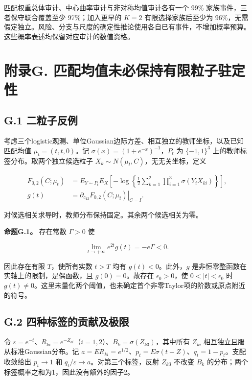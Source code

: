 \documentclass[11pt,a4paper]{article}
\begin{document}
匹配权重总体审计、中心曲率审计与非对称均值审计各有一个 99\%
家族事件，三者保守联合覆盖至少 97\%；加入更早的 \(K=2\)
有限选择家族后至少为
96\%，无需假定独立。风险、分支与尺度的确定性推论使用各自已有事件，不增加概率预算。这些概率表述均保留对应审计的数值资格。

\clearpage

\section*{附录G.
匹配均值未必保持有限粒子驻定性}\label{ux9644ux5f55g.-ux5339ux914dux5747ux503cux672aux5fc5ux4fddux6301ux6709ux9650ux7c92ux5b50ux9a7bux5b9aux6027}

\subsection*{G.1 二粒子反例}\label{g.1-ux4e8cux7c92ux5b50ux53cdux4f8b}

考虑三个logistic观测、单位Gaussian边际方差、相互独立的教师坐标，以及已知匹配均值
\(\mu_t=(t,t,0)\)。记 \(\sigma(x)=(1+e^{-x})^{-1}\)，\(P_t\) 为
\(\{-1,1\}^3\) 上的教师标签分布。取两个独立候选粒子
\(X_k\sim N(\mu_t,C)\)，无无关坐标，定义

\[
\begin{aligned}
F_{0,2}(C;\mu_t)
&=E_{Y\sim P_t}E_X\left[-\log\left\{\frac12\sum_{k=1}^2
\prod_{i=1}^3\sigma(Y_iX_{ki})\right\}\right],\\
g(t)&=\left.\partial_{c_{12}}F_{0,2}(C;\mu_t)\right|_{C=I}.
\end{aligned}
\tag{G.1}
\]

对候选相关求导时，教师分布保持固定。其余两个候选相关为零。

\textbf{命题G.1。} 存在常数 \(\Gamma>0\) 使

\[
\lim_{t\to+\infty}e^{2t}g(t)=-e\Gamma<0.
\tag{G.2}
\]

因此存在有限 \(T\)，使所有实数 \(t>T\) 均有 \(g(t)<0\)。此外，\(g\)
是非恒零整函数在实轴上的限制，是偶函数，且 \(g(0)=0\)。故存在
\(\epsilon_0>0\)，使 \(0<|t|<\epsilon_0\) 时
\(g(t)\ne0\)。这里未量化两个阈值，也未确定首个非零Taylor项的阶数或原点附近的符号。

\subsection*{G.2
四种标签的贡献及极限}\label{g.2-ux56dbux79cdux6807ux7b7eux7684ux8d21ux732eux53caux6781ux9650}

令
\(\varepsilon=e^{-t}\)、\(R_{ki}=e^{-Z_{ki}}\)（\(i=1,2\)）、\(B_k=\sigma(Z_{k3})\)，其中所有
\(Z_{ki}\) 相互独立且服从标准Gaussian分布。记
\(a=ER_{ki}=e^{1/2}\)、\(p_t=E\sigma(t+Z)\)、\(q_t=1-p_t\)。支配收敛给出
\(p_t\to1\) 和 \(q_t/\varepsilon\to a\)。对第三个标签，反射 \(Z_{k3}\)
不改变 \(B_k\) 的分布；两个标签概率之和为1，因此没有额外的因子2。
\end{document}
